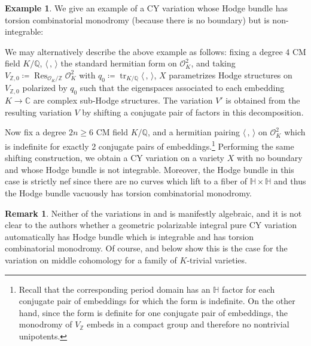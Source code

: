 \documentclass{amsart}
\theoremstyle{definition}
\newtheorem{eg}[theorem]{Example}
\newtheorem{rem}[theorem]{Remark}
\theoremstyle{remark}
\def\bH{\mathbb{H}}
\def\bZ{\mathbb{Z}}
\def\bQ{\mathbb{Q}}
\def\bC{\mathbb{C}}
\def\cO{\mathcal{O}}
\def\Res{\operatorname{Res}}
\def\tr{\operatorname{tr}}
\numberwithin{equation}{section}
\begin{document}
\begin{eg} \label{eg:tor not int}
We give an example of a CY variation whose Hodge bundle has torsion combinatorial monodromy (because there is no boundary) but is non-integrable:


We may alternatively describe the above example as follows: fixing a degree 4 CM field $K/\bQ$, $\langle\,,\,\rangle$ the standard hermitian form on $\cO_K^2$, and taking $V_{\bZ,0}\coloneqq  \Res_{\cO_K/\bZ}\cO_K^2$ with $q_0\coloneqq   \tr_{K/\bQ}\langle\,,\,\rangle$, $X$ parametrizes Hodge structures on $V_{\bZ,0}$ polarized by $q_0$ such that the eigenspaces associated to each embedding $K\to \bC$ are complex sub-Hodge structures.  The variation $V'$ is obtained from the resulting variation $V$ by shifting a conjugate pair of factors in this decomposition.

Now fix a degree $2n\geq 6$ CM field $K/\bQ$, and a hermitian pairing $\langle\,,\,\rangle$ on $\cO_K^2$ which is indefinite for exactly 2 conjugate pairs of embeddings.\footnote{Recall that the corresponding period domain has an $\bH$ factor for each conjugate pair of embeddings for which the form is indefinite.  On the other hand, since the form is definite for one conjugate pair of embeddings, the monodromy of $V_\bZ$ embeds in a compact group and therefore no nontrivial unipotents.}  Performing the same shifting construction, we obtain a CY variation on a variety $X$ with no boundary and whose Hodge bundle is not integrable. Moreover, the Hodge bundle in this case is strictly nef since there are no curves which lift to a fiber of $\bH\times \bH$ and thus the Hodge bundle vacuously has torsion combinatorial monodromy.
\end{eg}
\begin{rem}Neither of the variations in  and  is manifestly algebraic, and it is not clear to the authors whether a geometric polarizable integral pure CY variation automatically has Hodge bundle which is integrable and has torsion combinatorial monodromy.  Of course,  and  below show this is the case for the variation on middle cohomology for a family of $K$-trivial varieties. 
\end{rem}
\end{document}
